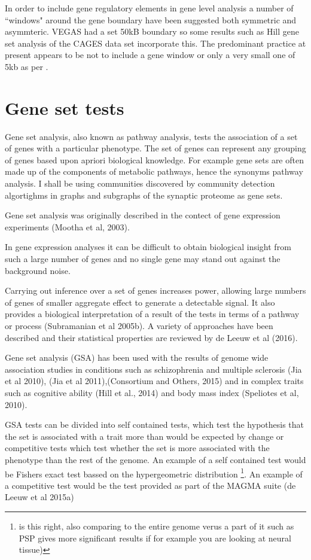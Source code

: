 In order to include gene regulatory elements in gene level analysis a number of ``windows" around the gene boundary have been suggested both symmetric and asymmteric. VEGAS had a set 50kB boundary so some results such as Hill \cite{hill2014human} gene set analysis of the CAGES data set incorporate this. The predominant practice at present appears to be not to include a gene window or only a very small one of 5kb as per \cite{savage2018genome}.


\section{ Gene set tests}

Gene set analysis, also known as pathway analysis, tests the association of a set of genes with a particular phenotype. The set of genes can represent any grouping of genes based upon apriori biological knowledge. For example gene sets are often made up of the components of metabolic pathways, hence the synonyms pathway analysis. I shall be using communities discovered by community detection algortighms in graphs and subgraphs of the synaptic proteome as gene sets.

Gene set analysis was originally described in the contect of gene expression experiments (Mootha et al, 2003).

In gene expression analyses it can be difficult to obtain biological insight from such a large number of genes and no single gene may stand out against the background noise.

Carrying out inference over a set of genes increases power, allowing large numbers of genes of smaller aggregate effect to generate a detectable signal. It also provides a biological interpretation of a result of the tests in terms of a pathway or process (Subramanian et al 2005b). A variety of approaches have been described and their statistical properties are reviewed by de Leeuw et al (2016).

Gene set analysis (GSA) has been used with the results of genome wide association studies in conditions such as schizophrenia and multiple sclerosis (Jia et al 2010), (Jia et al 2011),(Consortium and Others, 2015) and in complex traits such as cognitive ability (Hill et al., 2014) and body mass index (Speliotes et al, 2010).

GSA tests can be divided into self contained tests, which test the hypothesis that the set is associated with a trait more than would be expected by change or competitive tests which test whether the set is more associated with the phenotype than the rest of the genome. An example of a self contained test would be Fishers exact test bassed on the hypergeometric distribution \footnote{is this right, also comparing to the entire genome verus a part of it such as PSP gives more significant results if for example you are looking at neural tissue)}. An example of a competitive test would be the test provided as part of the MAGMA suite (de Leeuw et al 2015a)

